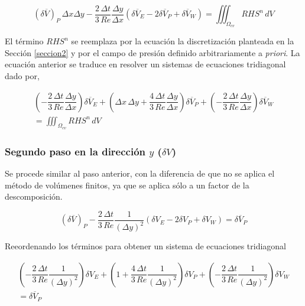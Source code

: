 \begin{equation}
(\delta \overline{V})_P \, \Delta x \Delta y - \dfrac{2 \, \Delta t}{3 \, Re} \dfrac{\Delta y}{\Delta x} \left( \delta \overline{V}_E -2 \delta \overline{V}_P + \delta \overline{V}_W \right) = \iiint_{\Omega_{cv}} RHS^n \, dV
\end{equation}

El término $RHS^n$ se reemplaza por la ecuación la discretización planteada en la Sección \ref{seccion2} y por el campo de presión definido arbitrariamente a \textit{priori}. La ecuación anterior se traduce en resolver un sistemas de ecuaciones tridiagonal dado por,

\begin{equation}
\begin{split}
\left( - \dfrac{2 \, \Delta t}{3 \, Re} \dfrac{\Delta y}{\Delta x}  \right) \delta \overline{V}_E + \left( \Delta x \, \Delta y + \dfrac{4 \, \Delta t}{3 \, Re} \dfrac{\Delta y}{\Delta x}  \right) \delta \overline{V}_P + \left( - \dfrac{2 \, \Delta t}{3 \, Re} \dfrac{\Delta y}{\Delta x}  \right) \delta \overline{V}_W \\
 = \iiint_{\Omega_{cv}} RHS^n \, dV
\end{split}
\end{equation}

\subsubsection{Segundo paso en la dirección $y$ ($\delta V$)}

Se procede similar al paso anterior, con la diferencia de que no se aplica el método de volúmenes finitos, ya que se aplica sólo a un factor de la descomposición.  

\begin{equation}
(\delta \overline{V})_P - \dfrac{2 \, \Delta t}{3 \, Re} \dfrac{1}{(\Delta y)^2} \left( \delta V_E -2 \delta V_P + \delta V_W \right) = \delta \overline{V}_P
\end{equation}

Reeordenando los términos para obtener un sistema de ecuaciones tridiagonal

\begin{equation}
\begin{split}
\left( - \dfrac{2 \, \Delta t}{3 \, Re} \dfrac{1}{(\Delta y)^2}  \right) \delta V_E + \left( 1 + \dfrac{4 \, \Delta t}{3 \, Re} \dfrac{1}{(\Delta y)^2}  \right) \delta V_P + \left( - \dfrac{2 \, \Delta t}{3 \, Re} \dfrac{1}{(\Delta y)^2}  \right) \delta V_W \\
 = \delta \overline{V}_P
\end{split}
\end{equation}

